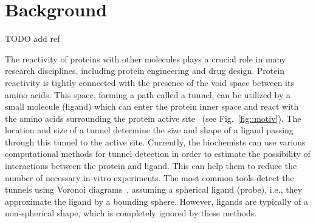 \documentclass{bmcart}
\begin{document}

\section*{Background}

{\color{red}TODO add ref \cite{zhou2010gates}}

The reactivity of proteins with other molecules plays a crucial role in many research disciplines, including protein engineering and drug design.
Protein reactivity is tightly connected with the presence of the void space between its amino acids. 
This space, forming a path called a tunnel, can be utilized by a small molecule (ligand) which can enter the protein inner space and react with the amino acids surrounding the protein active site~\cite{gora2013gates,marques2017enzyme} (see Fig.~\ref{fig::motiv}).
The location and size of a tunnel determine the size and shape of a ligand passing through this tunnel to the active site.
Currently, the biochemists can use various computational methods for tunnel detection in order to estimate the possibility of interactions between the protein and ligand.
This can help them to reduce the number of necessary in-vitro experiments.
The most common tools detect the tunnels using Voronoi diagrams~\cite{yaffe2008,caver3}, assuming a spherical ligand (probe), 
i.e., they approximate the ligand by a bounding sphere.
However, ligands are typically of a non-spherical shape, which is completely ignored by these methods. 
\end{document}
